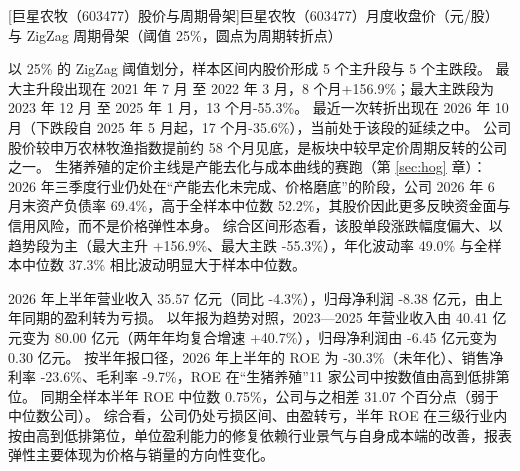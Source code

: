 \begin{center}
\begin{minipage}{\textwidth}\centering
{}

[巨星农牧（603477）股价与周期骨架]{巨星农牧（603477）月度收盘价（元/股）与 ZigZag 周期骨架（阈值 25\%，圆点为周期转折点）}
\end{minipage}
\end{center}

 以 25\% 的 ZigZag 阈值划分，样本区间内股价形成 5 个主升段与 5 个主跌段。 最大主升段出现在 2021 年 7 月 至 2022 年 3 月，8 个月+156.9\%；最大主跌段为 2023 年 12 月 至 2025 年 1 月，13 个月-55.3\%。 最近一次转折出现在 2026 年 10 月（下跌段自 2025 年 5 月起，17 个月-35.6\%），当前处于该段的延续之中。 公司股价较申万农林牧渔指数提前约 58 个月见底，是板块中较早定价周期反转的公司之一。 生猪养殖的定价主线是产能去化与成本曲线的赛跑（第 \ref{sec:hog} 章）：2026 年三季度行业仍处在“产能去化未完成、价格磨底”的阶段，公司 2026 年 6 月末资产负债率 69.4\%，高于全样本中位数 52.2\%，其股价因此更多反映资金面与信用风险，而不是价格弹性本身。 综合区间形态看，该股单段涨跌幅度偏大、以趋势段为主（最大主升 +156.9\%、最大主跌 -55.3\%），年化波动率 49.0\% 与全样本中位数 37.3\% 相比波动明显大于样本中位数。

 2026 年上半年营业收入 35.57 亿元（同比 -4.3\%），归母净利润 -8.38 亿元，由上年同期的盈利转为亏损。 以年报为趋势对照，2023---2025 年营业收入由 40.41 亿元变为 80.00 亿元（两年年均复合增速 +40.7\%），归母净利润由 -6.45 亿元变为 0.30 亿元。 按半年报口径，2026 年上半年的 ROE 为 -30.3\%（未年化）、销售净利率 -23.6\%、毛利率 -9.7\%，ROE 在“生猪养殖”11 家公司中按数值由高到低排第位。 同期全样本半年 ROE 中位数 0.75\%，公司与之相差 31.07 个百分点（弱于中位数公司）。 综合看，公司仍处亏损区间、由盈转亏，半年 ROE 在三级行业内按由高到低排第位，单位盈利能力的修复依赖行业景气与自身成本端的改善，报表弹性主要体现为价格与销量的方向性变化。

